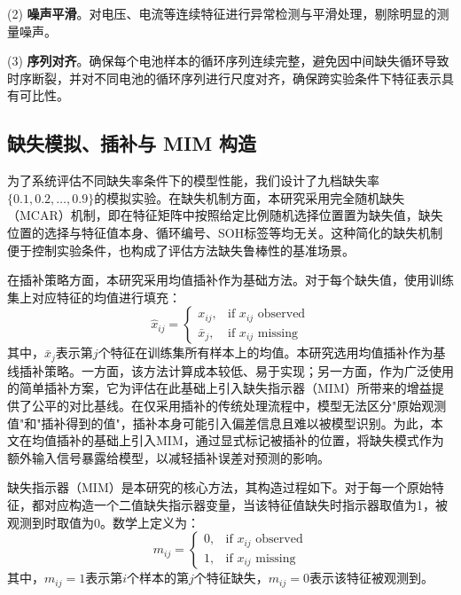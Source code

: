 \documentclass[10pt,a4paper]{ctexart}
\begin{document}
(2) \textbf{噪声平滑}。对电压、电流等连续特征进行异常检测与平滑处理，剔除明显的测量噪声。

(3) \textbf{序列对齐}。确保每个电池样本的循环序列连续完整，避免因中间缺失循环导致时序断裂，并对不同电池的循环序列进行尺度对齐，确保跨实验条件下特征表示具有可比性。

\subsection{缺失模拟、插补与 MIM 构造}

为了系统评估不同缺失率条件下的模型性能，我们设计了九档缺失率$\{0.1, 0.2, \ldots, 0.9\}$的模拟实验。在缺失机制方面，本研究采用完全随机缺失（MCAR）机制，即在特征矩阵中按照给定比例随机选择位置置为缺失值，缺失位置的选择与特征值本身、循环编号、SOH标签等均无关。这种简化的缺失机制便于控制实验条件，也构成了评估方法缺失鲁棒性的基准场景。

在插补策略方面，本研究采用均值插补作为基础方法。对于每个缺失值，使用训练集上对应特征的均值进行填充：
\begin{equation}
    \hat{x}_{ij} = \begin{cases}
        x_{ij}, & \text{if } x_{ij} \text{ observed} \\
        \bar{x}_j, & \text{if } x_{ij} \text{ missing}
    \end{cases}
\end{equation}
其中，$\bar{x}_j$表示第$j$个特征在训练集所有样本上的均值。本研究选用均值插补作为基线插补策略。一方面，该方法计算成本较低、易于实现；另一方面，作为广泛使用的简单插补方案，它为评估在此基础上引入缺失指示器（MIM）所带来的增益提供了公平的对比基线。在仅采用插补的传统处理流程中，模型无法区分"原始观测值"和"插补得到的值"，插补本身可能引入偏差信息且难以被模型识别。为此，本文在均值插补的基础上引入MIM，通过显式标记被插补的位置，将缺失模式作为额外输入信号暴露给模型，以减轻插补误差对预测的影响。

缺失指示器（MIM）是本研究的核心方法，其构造过程如下。对于每一个原始特征，都对应构造一个二值缺失指示器变量，当该特征值缺失时指示器取值为1，被观测到时取值为0。数学上定义为：
\begin{equation}
    m_{ij} = 
    \begin{cases}
        0, & \text{if } x_{ij} \text{ observed} \\
        1, & \text{if } x_{ij} \text{ missing}
    \end{cases}
\end{equation}
其中，$m_{ij}=1$表示第$i$个样本的第$j$个特征缺失，$m_{ij}=0$表示该特征被观测到。
\end{document}
